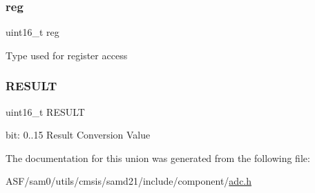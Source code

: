 \subsubsection{\texorpdfstring{reg}{reg}}
{\footnotesize\ttfamily uint16\+\_\+t reg}

Type used for register access \mbox{\label{union_a_d_c___r_e_s_u_l_t___type_aa81d50f7080d10e9dce5e97adcd3ac8b}} 
\subsubsection{\texorpdfstring{RESULT}{RESULT}}
{\footnotesize\ttfamily uint16\+\_\+t R\+E\+S\+U\+LT}

bit\+: 0..15 Result Conversion Value 

The documentation for this union was generated from the following file\+:\begin{DoxyCompactItemize}
\item 
A\+S\+F/sam0/utils/cmsis/samd21/include/component/\mbox{\hyperlink{component_2adc_8h}{adc.\+h}}\end{DoxyCompactItemize}
